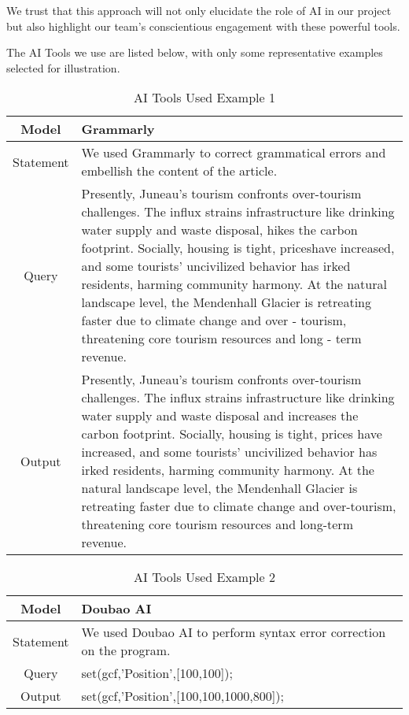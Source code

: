 \documentclass{mcmthesis}
\begin{document}
{We trust that this approach will not only elucidate the role of AI in our project but also highlight our team's conscientious engagement with these powerful tools.}

{The AI Tools we use are listed below, with only some representative examples selected for illustration.}

\begin{table}[htbp]
  \centering
  \caption{AI Tools Used Example 1}
  \label{tab:AI1}
  \begin{tabular}{c p{15cm}}
    \toprule
    Model & Grammarly\\
    \midrule
    Statement & We used Grammarly to correct grammatical errors and embellish the content of the article.\\
    \midrule
    Query & Presently, Juneau's tourism confronts over-tourism challenges. The influx strains infrastructure like drinking water supply and waste disposal, hikes the carbon footprint. Socially, housing is tight, priceshave increased, and some tourists' uncivilized behavior has irked residents, harming community harmony. At the natural landscape level, the Mendenhall Glacier is retreating faster due to climate change and over - tourism, threatening core tourism resources and long - term revenue.\\
    \midrule
    Output & Presently, Juneau's tourism confronts over-tourism challenges. The influx strains infrastructure like drinking water supply and waste disposal and increases the carbon footprint. Socially, housing is tight, prices have increased, and some tourists' uncivilized behavior has irked residents, harming community harmony. At the natural landscape level, the Mendenhall Glacier is retreating faster due to climate change and over-tourism, threatening core tourism resources and long-term revenue.\\
    \bottomrule
  \end{tabular}
\end{table}

\begin{table}[htbp]
  \centering
  \caption{AI Tools Used Example 2}
  \label{tab:AI2}
  \begin{tabular}{c p{15cm}}
    \toprule
    Model & Doubao AI\\
    \midrule
    Statement & We used Doubao AI to perform syntax error correction on the program.\\
    \midrule
    Query & set(gcf,'Position',[100,100]);\\
    \midrule
    Output & set(gcf,'Position',[100,100,1000,800]);\\
    \bottomrule
  \end{tabular}
\end{table}
\end{document}
